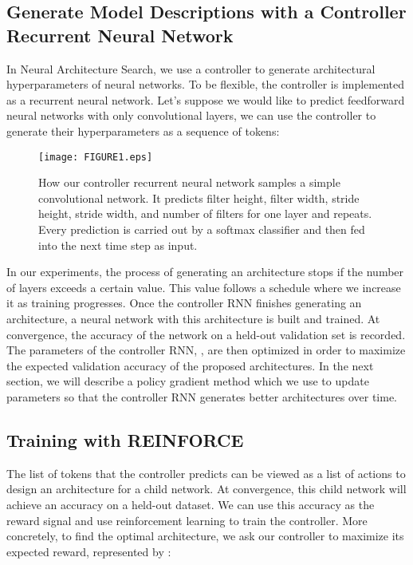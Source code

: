 \documentclass{article} \usepackage{iclr2017_conference,times}
\begin{document}
\fi


\subsection{Generate Model Descriptions with a Controller Recurrent Neural Network}
\label{sec:Controller_RNN}

In Neural Architecture Search, we use a controller to generate architectural hyperparameters of neural networks. To be flexible, the controller is implemented as a recurrent neural network. Let's suppose we would like to predict feedforward neural networks with only convolutional layers, we can use the controller to generate their hyperparameters as a sequence of tokens:  




\begin{figure}[h!]
\begin{center}
\centerline{\texttt{[image: FIGURE1.eps]}}
\caption{How our controller recurrent neural network samples a simple convolutional network. It predicts filter height, filter width, stride height, stride width, and number of filters for one layer and repeats. Every prediction is carried out by a softmax classifier and then fed into the next time step as input.}
\label{figure:Controller_RNN}
\end{center}
\end{figure}








In our experiments, the process of generating an architecture stops if the number of layers exceeds a certain value. This value follows a schedule where we increase it as training progresses. Once the controller RNN finishes generating an architecture, a neural network  with this architecture is built and trained. At convergence, the accuracy of the network on a held-out validation set is recorded. The parameters of the controller RNN, , are then optimized in order to maximize the expected validation accuracy of the proposed architectures. In the next section, we will describe a policy gradient method which we use to update parameters  so that the controller RNN generates better architectures over time.




\subsection{Training with REINFORCE}
The list of tokens that the controller predicts can be viewed as a list of actions  to design an architecture for a child network. At convergence, this child network will achieve an accuracy  on a held-out dataset. We can use this accuracy  as the reward signal and use reinforcement learning to train the controller. More concretely, to find the optimal architecture, we ask our controller to maximize its expected reward, represented by :
\end{document}
